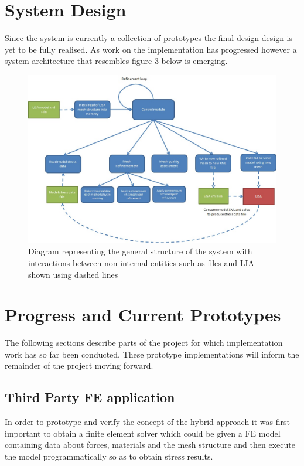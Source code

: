 \documentclass{article}
\begin{document}
\section{System Design}
Since the system is currently a collection of prototypes the final design design is yet to be fully realised. As work on the implementation has progressed however a system architecture that resembles figure 3 below is emerging.

\begin{figure}[!h]
  \centerline{\includegraphics[width=150mm, scale=1]{SystemDesignDiagram.jpeg}}
  \caption{Diagram representing the general structure of the system with interactions between non internal entities such as files and LIA shown using dashed lines}
  \label{fig:h-refinementImp}
\end{figure}


\section{Progress and Current Prototypes}
The following sections describe parts of the project for which implementation work has so far been conducted. These prototype implementations will inform the remainder of the project moving forward.

\subsection{Third Party FE application}

In order to prototype and verify the concept of the hybrid approach it was first important to obtain a finite element solver which could be given a FE model containing data about forces, materials and the mesh structure and then execute the model programmatically so as to obtain stress results. \\ 
\end{document}
